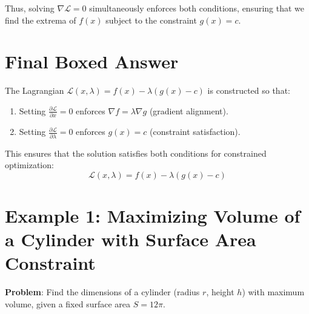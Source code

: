 \documentclass{article}
\begin{document}
Thus, solving $ \nabla \mathcal{L} = 0 $ simultaneously enforces both conditions, ensuring that we find the extrema of $ f(x) $ subject to the constraint $ g(x) = c $.

\section*{Final Boxed Answer}

The Lagrangian $ \mathcal{L}(x, \lambda) = f(x) - \lambda (g(x) - c) $ is constructed so that:
\begin{enumerate}
    \item Setting $ \frac{\partial \mathcal{L}}{\partial x} = 0 $ enforces $ \nabla f = \lambda \nabla g $ (gradient alignment).
    \item Setting $ \frac{\partial \mathcal{L}}{\partial \lambda} = 0 $ enforces $ g(x) = c $ (constraint satisfaction).
\end{enumerate}

This ensures that the solution satisfies both conditions for constrained optimization:
\[
\boxed{\mathcal{L}(x, \lambda) = f(x) - \lambda (g(x) - c)}
\]


\section*{Example 1: Maximizing Volume of a Cylinder with Surface Area Constraint}

\textbf{Problem}: Find the dimensions of a cylinder (radius $ r $, height $ h $) with maximum volume, given a fixed surface area $ S = 12\pi $. \\
\end{document}
